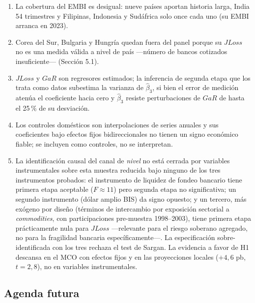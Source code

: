 \begin{enumerate}
\item La cobertura del EMBI es desigual: nueve países aportan historia larga, India 54 trimestres y Filipinas, Indonesia y Sudáfrica solo once cada uno (su EMBI arranca en 2023).

\item Corea del Sur, Bulgaria y Hungría quedan fuera del panel porque su $JLoss$ no es una medida válida a nivel de país —número de bancos cotizados insuficiente— (Sección 5.1).

\item $JLoss$ y $GaR$ son regresores estimados; la inferencia de segunda etapa que los trata como datos subestima la varianza de $\hat\beta_3$, si bien el error de medición atenúa el coeficiente hacia cero y $\hat\beta_3$ resiste perturbaciones de $GaR$ de hasta el 25\,\% de su desviación.

\item Los controles domésticos son interpolaciones de series anuales y sus coeficientes bajo efectos fijos bidireccionales no tienen un signo económico fiable; se incluyen como controles, no se interpretan.

\item La identificación causal del canal de \emph{nivel} no está cerrada por variables instrumentales sobre esta muestra reducida bajo ninguno de los tres instrumentos probados: el instrumento de liquidez de fondeo bancario tiene primera etapa aceptable ($F\approx11$) pero segunda etapa no significativa; un segundo instrumento (dólar amplio BIS) da signo opuesto; y un tercero, más exógeno por diseño (términos de intercambio por exposición sectorial a \textit{commodities}, con participaciones pre-muestra 1998--2003), tiene primera etapa prácticamente nula para $JLoss$ —relevante para el riesgo soberano agregado, no para la fragilidad bancaria específicamente—. La especificación sobre-identificada con los tres rechaza el test de Sargan. La evidencia a favor de H1 descansa en el MCO con efectos fijos y en las proyecciones locales ($+4{,}6$ pb, $t=2{,}8$), no en variables instrumentales.
\end{enumerate}

\subsection{Agenda futura}

